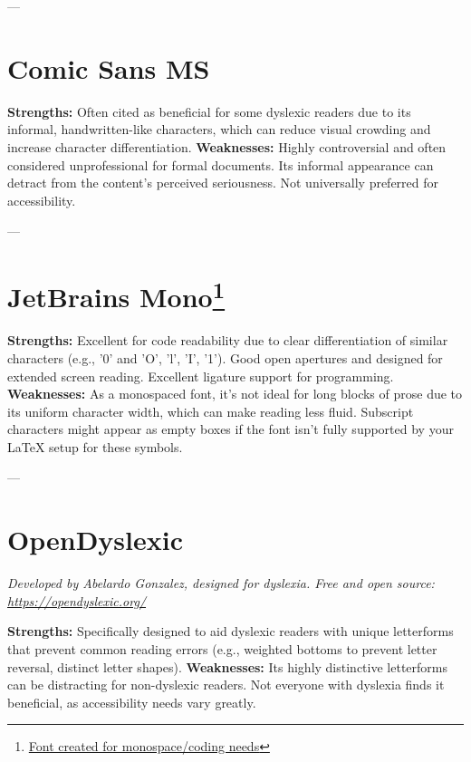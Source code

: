 ---
\pagebreak
\section{Comic Sans MS}\label{trouble9}
\begin{raggedright}
\textbf{Strengths:} Often cited as beneficial for some dyslexic readers due to its informal, handwritten-like characters, which can reduce visual crowding and increase character differentiation.
\textbf{Weaknesses:} Highly controversial and often considered unprofessional for formal documents. Its informal appearance can detract from the content's perceived seriousness. Not universally preferred for accessibility.

\FontSample{\comicsansfont}
\end{raggedright}

---
\pagebreak
\hypertarget{trouble10}{}\section[JetBrains Mono]{JetBrains Mono\footnote{\href{https://www.jetbrains.com/lp/mono/}{Font created for monospace/coding needs}}}\label{trouble10}
\begin{raggedright}
\textbf{Strengths:} Excellent for code readability due to clear differentiation of similar characters (e.g., '0' and 'O', 'l', 'I', '1'). Good open apertures and designed for extended screen reading. Excellent ligature support for programming.
\textbf{Weaknesses:} As a monospaced font, it's not ideal for long blocks of prose due to its uniform character width, which can make reading less fluid. Subscript characters might appear as empty boxes if the font isn't fully supported by your LaTeX setup for these symbols.

\FontSample{\jetbrainsmonofont}
\end{raggedright}

---
\pagebreak
\section{OpenDyslexic}
\emph{Developed by Abelardo Gonzalez, designed for dyslexia. Free and open source: \url{https://opendyslexic.org/}}
\begin{raggedright}
\textbf{Strengths:} Specifically designed to aid dyslexic readers with unique letterforms that prevent common reading errors (e.g., weighted bottoms to prevent letter reversal, distinct letter shapes).
\textbf{Weaknesses:} Its highly distinctive letterforms can be distracting for non-dyslexic readers. Not everyone with dyslexia finds it beneficial, as accessibility needs vary greatly.

\FontSample{\opendyslexicfont}
\end{raggedright}

